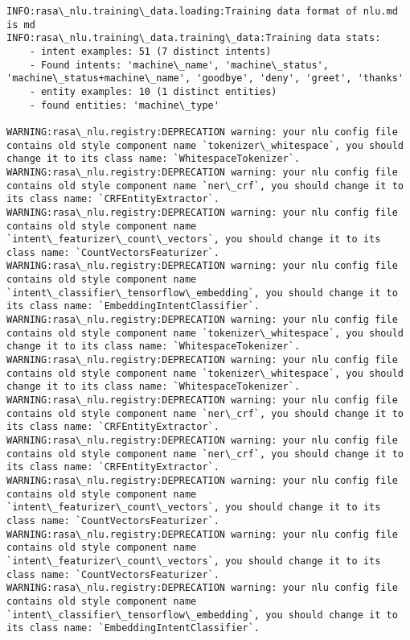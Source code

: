 \documentclass[11pt]{article}
\begin{document}
    \begin{Verbatim}[commandchars=\\\{\}]
INFO:rasa\_nlu.training\_data.loading:Training data format of nlu.md is md
INFO:rasa\_nlu.training\_data.training\_data:Training data stats: 
	- intent examples: 51 (7 distinct intents)
	- Found intents: 'machine\_name', 'machine\_status', 'machine\_status+machine\_name', 'goodbye', 'deny', 'greet', 'thanks'
	- entity examples: 10 (1 distinct entities)
	- found entities: 'machine\_type'

WARNING:rasa\_nlu.registry:DEPRECATION warning: your nlu config file contains old style component name `tokenizer\_whitespace`, you should change it to its class name: `WhitespaceTokenizer`.
WARNING:rasa\_nlu.registry:DEPRECATION warning: your nlu config file contains old style component name `ner\_crf`, you should change it to its class name: `CRFEntityExtractor`.
WARNING:rasa\_nlu.registry:DEPRECATION warning: your nlu config file contains old style component name `intent\_featurizer\_count\_vectors`, you should change it to its class name: `CountVectorsFeaturizer`.
WARNING:rasa\_nlu.registry:DEPRECATION warning: your nlu config file contains old style component name `intent\_classifier\_tensorflow\_embedding`, you should change it to its class name: `EmbeddingIntentClassifier`.
WARNING:rasa\_nlu.registry:DEPRECATION warning: your nlu config file contains old style component name `tokenizer\_whitespace`, you should change it to its class name: `WhitespaceTokenizer`.
WARNING:rasa\_nlu.registry:DEPRECATION warning: your nlu config file contains old style component name `tokenizer\_whitespace`, you should change it to its class name: `WhitespaceTokenizer`.
WARNING:rasa\_nlu.registry:DEPRECATION warning: your nlu config file contains old style component name `ner\_crf`, you should change it to its class name: `CRFEntityExtractor`.
WARNING:rasa\_nlu.registry:DEPRECATION warning: your nlu config file contains old style component name `ner\_crf`, you should change it to its class name: `CRFEntityExtractor`.
WARNING:rasa\_nlu.registry:DEPRECATION warning: your nlu config file contains old style component name `intent\_featurizer\_count\_vectors`, you should change it to its class name: `CountVectorsFeaturizer`.
WARNING:rasa\_nlu.registry:DEPRECATION warning: your nlu config file contains old style component name `intent\_featurizer\_count\_vectors`, you should change it to its class name: `CountVectorsFeaturizer`.
WARNING:rasa\_nlu.registry:DEPRECATION warning: your nlu config file contains old style component name `intent\_classifier\_tensorflow\_embedding`, you should change it to its class name: `EmbeddingIntentClassifier`.

\end{Verbatim}
\end{document}
